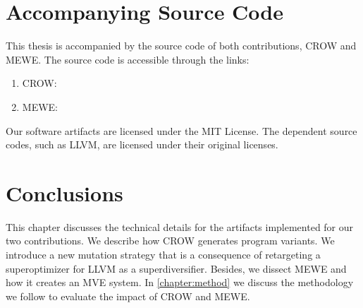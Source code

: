 


\section*{Accompanying Source Code}

This thesis is accompanied by the source code of both contributions, CROW and MEWE. The source code is accessible through the links:
\begin{enumerate}
    \item CROW: 
    \item MEWE: 
\end{enumerate}

Our software artifacts are licensed under the MIT License. The dependent source codes, such as LLVM, are licensed under their original licenses.

\section*{Conclusions}

This chapter discusses the technical details for the artifacts implemented for our two contributions.
We describe how CROW generates program variants.
We introduce a new mutation strategy that is a consequence of retargeting a superoptimizer for LLVM as a superdiversifier.
Besides, we dissect MEWE and how it creates an MVE system.
In \autoref{chapter:method} we discuss the methodology we follow to evaluate the impact of CROW and MEWE.